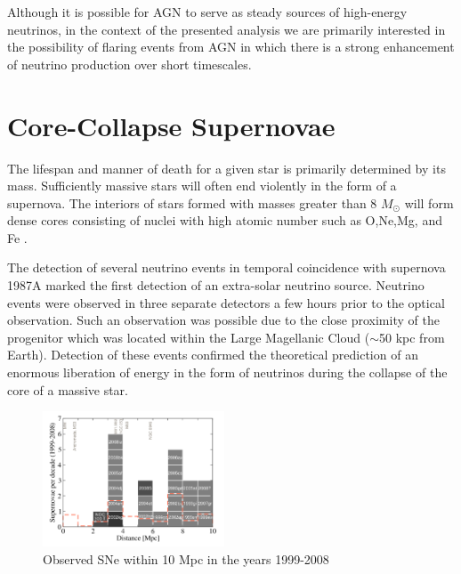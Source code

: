 \documentclass{gatech-thesis}
\begin{document}
Although it is possible for AGN to serve as steady sources of high-energy neutrinos, in the context of the presented analysis we are primarily interested in the possibility of flaring events from AGN in which there is a strong enhancement of neutrino production over short timescales.

\section{Core-Collapse Supernovae}
The lifespan and manner of death for a given star is primarily determined by its mass. Sufficiently massive stars will often end violently in the form of a supernova. The interiors of stars formed with masses greater than 8 $M_{\odot}$ will form dense cores consisting of nuclei with high atomic number such as O,Ne,Mg, and Fe \cite{2003astro.ph..1006H}. 

The detection of several neutrino events in temporal coincidence with supernova 1987A marked the first detection of an extra-solar neutrino source. Neutrino events were observed in three separate detectors a few hours prior to the optical observation. Such an observation was possible due to the close proximity of the progenitor which was located within the Large Magellanic Cloud ($\sim$50 kpc from Earth). Detection of these events confirmed the theoretical prediction of an enormous liberation of energy in the form of neutrinos during the collapse of the core of a massive star.


\begin{figure}
  \begin{center}
    \includegraphics[width=0.48\textwidth,keepaspectratio]{NearbySNCatalogue.png}
  \end{center}
  \caption{Observed SNe within 10 Mpc in the years 1999-2008 \cite{2011PhRvD..83l3008K}}
  \label{fig:local_ccsne}
\end{figure}
\end{document}
